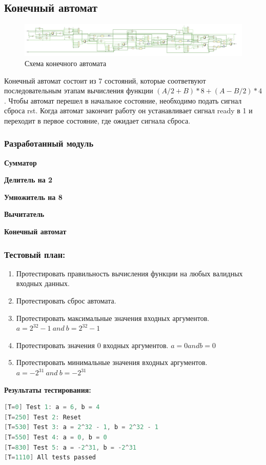 \documentclass[12pt,onecolumn]{article}
\begin{document}
\subsection{Конечный автомат}
\begin{figure}[H]
  \centering
  \includegraphics[width=\textwidth]{image/fsm.png}
  \caption{Схема конечного автомата}
\end{figure}

Конечный автомат состоит из 7 состояний, которые соответвуют последовательным этапам вычисления функции $(A/2+B)*8 + (A-B/2)*4$.
Чтобы автомат перешел в начальное состояние, необходимо подать сигнал сброса rst.
Когда автомат закончит работу он устанавливает сигнал ready в 1 и переходит в первое состояние, где ожидает сигнала сброса.
\subsubsection{Разработанный модуль}
\textbf{Сумматор}

\textbf{Делитель на 2}

\textbf{Умножитель на 8}

\textbf{Вычитатель}

\textbf{Конечный автомат}

\subsubsection{Тестовый план:}
\begin{enumerate}
  \item Протестировать правильность вычисления функции на любых валидных входных данных.
  \item Протестировать сброс автомата.
  \item Протестировать максимальные значения входных аргументов. $a = 2^{32} - 1~ and~ b = 2^{32} - 1$
  \item Протестировать значения 0 входных аргументов. $a = 0 and b = 0$
  \item Протестировать минимальные значения входных аргументов. $a = -2^{31}~ and~ b = -2^{31}$
\end{enumerate}

\textbf{Результаты тестирования:}
\begin{lstlisting}[language=verilog]
[T=0] Test 1: a = 6, b = 4
[T=250] Test 2: Reset
[T=530] Test 3: a = 2^32 - 1, b = 2^32 - 1
[T=550] Test 4: a = 0, b = 0
[T=830] Test 5: a = -2^31, b = -2^31
[T=1110] All tests passed
\end{lstlisting}
\end{document}
